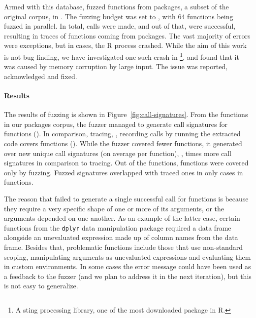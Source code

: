 \documentclass[sigplan,nonacm,anonymous,review]{acmart}
\begin{document}
Armed with this database, \tool fuzzed \UFNumFunctions functions from \UFNumPackages packages, a subset of the original corpus, in \UFTracingTime.
The fuzzing budget was set to \UFTracingBudget, with 64 functions being fuzzed in parallel.
In total, \UFNumTracesRnd calls were made, and out of that, \UFRatioSucesssTraces were successful, resulting in \UFNumSuccessTraces traces of \UFNumSuccessFunctions functions coming from \UFNumSuccessPackages packages.
The vast majority of errors were exceptions, but in \UFNumCrashedRSessions cases, the R process crashed.
While the aim of this work is not bug finding, we have investigated one such crash in \footnote{A sting processing library, one of the most downloaded package in R.}, and found that it was caused by memory corruption by large input.
The issue was reported, acknowledged and fixed.

\paragraph{Results}

The results of fuzzing is shown in Figure~\ref{fig:call-signatures}.
From the \UFNumFunctions functions in our \UFNumPackages packages corpus, the fuzzer managed to generate call signatures for \UFNumFunctionsSignatrSignature functions (\UFNumFunctionsSignatrToCorpusSignatureRatio).
In comparison, tracing, \Ie, recording calls by running the extracted code covers \UFNumFunctionsBaselineSignature functions (\UFNumFunctionsBaselineToCorpusSignatureRatio).
While the fuzzer covered fewer functions, it generated over \UFSignatrSignaturesRnd new unique call signatures (on average \UFAvgNewSignatrSignature per function), \Ie, \UFSignatrBaselineSignaturesRatio times more call signatures in comparison to tracing.
Out of the \UFNumFunctionsSignatrSignature functions, \UFNumFunctionsOnlySignatrSignature functions were covered only by fuzzing.
Fuzzed signatures overlapped with traced ones in only \UFSharedSignatures cases in \UFSharedSignatuesFunctions functions.

The reason that \tool failed to generate a single successful call for \UFNumMissingFunctionSignatr functions is because they require a very specific shape of one or more of its arguments, or the arguments depended on one-another.
As an example of the latter case, certain functions from the {\tt dplyr} data manipulation package required a data frame alongside an unevaluated expression made up of column names from the data frame. 
Besides that, problematic functions include those that use non-standard scoping, manipulating arguments as unevaluated expressions and evaluating them in custom environments.
In some cases the error message could have been used as a feedback to the fuzzer (and we plan to address it in the next iteration), but this is not easy to generalize.
\end{document}
